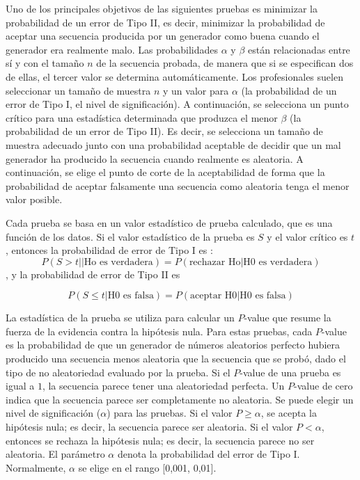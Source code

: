 Uno de los principales objetivos de las siguientes pruebas es minimizar la probabilidad de un error de Tipo II, es decir, minimizar la probabilidad de aceptar una secuencia producida por un generador como buena cuando el generador era realmente malo. Las probabilidades $\alpha$ y $\beta$ están relacionadas entre sí y con el tamaño $n$ de la secuencia probada, de manera que si se especifican dos de ellas, el tercer valor se determina automáticamente. Los profesionales suelen seleccionar un tamaño de muestra $n$ y un valor para $\alpha$ (la probabilidad de un error de Tipo I, el nivel de significación). A continuación, se selecciona un punto crítico para una estadística determinada que produzca el menor $\beta$ (la probabilidad de un error de Tipo II). Es decir, se selecciona un tamaño de muestra adecuado junto con una probabilidad aceptable de decidir que un mal generador ha producido la secuencia cuando realmente es aleatoria. A continuación, se elige el punto de corte de la aceptabilidad de forma que la probabilidad de aceptar falsamente una secuencia como aleatoria tenga el menor valor posible.

Cada prueba se basa en un valor estadístico de prueba calculado, que es una función de los datos. Si el valor estadístico de la prueba es $S$ y el valor crítico es $t$, entonces la probabilidad de error de Tipo I es :
\begin{equation}
P(S > t || \text{Ho es verdadera}) = P(\text{rechazar Ho} | \text{H0 es verdadera})
\end{equation}
, y la probabilidad de error de Tipo II es 

\begin{equation}
P(S \leq t | \text{H0 es falsa}) = P(\text{aceptar H0} | \text{H0 es falsa})
\end{equation}


La estadística de la prueba se utiliza para calcular un $P$-value que resume la fuerza de la evidencia contra la hipótesis nula. Para estas pruebas, cada $P$-value es la probabilidad de que un generador de números aleatorios perfecto hubiera producido una secuencia menos aleatoria que la secuencia que se probó, dado el tipo de no aleatoriedad evaluado por la prueba. Si el $P$-value de una prueba es igual a $1$, la secuencia parece tener una aleatoriedad perfecta. Un $P$-value de cero indica que la secuencia parece ser completamente no aleatoria. Se puede elegir un nivel de significación ($\alpha$) para las pruebas. Si el valor $P \geq \alpha$, se acepta la hipótesis nula; es decir, la secuencia parece ser aleatoria. Si el valor $P < \alpha$, entonces se rechaza la hipótesis nula; es decir, la secuencia parece no ser aleatoria. El parámetro $\alpha$ denota la probabilidad del error de Tipo I. Normalmente, $\alpha$ se elige en el rango [0,001, 0,01].



